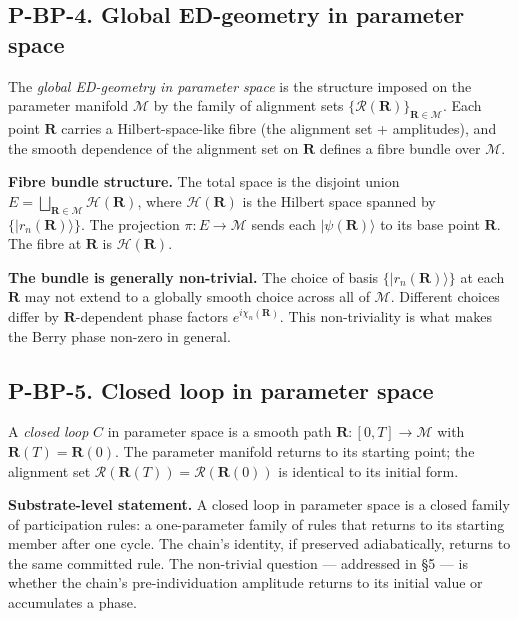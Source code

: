 \documentclass[11pt,a4paper]{article}
\begin{document}
\subsection{P-BP-4. Global ED-geometry in parameter space}

The \emph{global ED-geometry in parameter space} is the structure imposed on the parameter manifold $\mathcal{M}$ by the family of alignment sets $\{\mathcal{R}(\mathbf{R})\}_{\mathbf{R} \in \mathcal{M}}$. Each point $\mathbf{R}$ carries a Hilbert-space-like fibre (the alignment set + amplitudes), and the smooth dependence of the alignment set on $\mathbf{R}$ defines a fibre bundle over $\mathcal{M}$.

\textbf{Fibre bundle structure.} The total space is the disjoint union $E = \bigsqcup_{\mathbf{R}\in\mathcal{M}} \mathcal{H}(\mathbf{R})$, where $\mathcal{H}(\mathbf{R})$ is the Hilbert space spanned by $\{|r_n(\mathbf{R})\rangle\}$. The projection $\pi: E \to \mathcal{M}$ sends each $|\psi(\mathbf{R})\rangle$ to its base point $\mathbf{R}$. The fibre at $\mathbf{R}$ is $\mathcal{H}(\mathbf{R})$.

\textbf{The bundle is generally non-trivial.} The choice of basis $\{|r_n(\mathbf{R})\rangle\}$ at each $\mathbf{R}$ may not extend to a globally smooth choice across all of $\mathcal{M}$. Different choices differ by $\mathbf{R}$-dependent phase factors $e^{i\chi_n(\mathbf{R})}$. This non-triviality is what makes the Berry phase non-zero in general.

\subsection{P-BP-5. Closed loop in parameter space}

A \emph{closed loop} $C$ in parameter space is a smooth path $\mathbf{R}: [0,T]\to \mathcal{M}$ with $\mathbf{R}(T) = \mathbf{R}(0)$. The parameter manifold returns to its starting point; the alignment set $\mathcal{R}(\mathbf{R}(T)) = \mathcal{R}(\mathbf{R}(0))$ is identical to its initial form.

\textbf{Substrate-level statement.} A closed loop in parameter space is a closed family of participation rules: a one-parameter family of rules that returns to its starting member after one cycle. The chain's identity, if preserved adiabatically, returns to the same committed rule. The non-trivial question --- addressed in \S5 --- is whether the chain's pre-individuation amplitude returns to its initial value or accumulates a phase.
\end{document}
